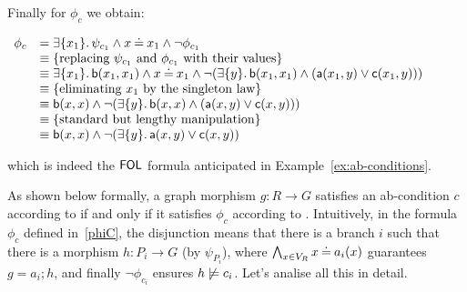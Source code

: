 \begin{example}
\medskip
Finally for $\phi_c$ we obtain:

$
\begin{array}{ll}
\phi_{c} & = \exists \{x_{1}\}.\, \psi_{c_{1}} \land x \mathbin{\doteq} x_{1} \land  \neg \phi_{c_{1}}\\
 & \equiv \{\text{replacing $\psi_{c_{1}}$ and $\phi_{c_{1}}$ with their values}\}\\
& \equiv \exists \{x_{1}\}.\,\mathsf{b}(x_{1},x_{1}) \land x \mathbin{\doteq} x_{1} \land  \neg (\exists \{y\} .\, \mathsf{b}(x_{1},x_{1})\land (\mathsf{a}(x_{1},y) \lor \mathsf{c}(x_{1},y)))\\
 & \equiv \{\text{eliminating $x_1$ by the singleton law}\}\\
& \equiv \mathsf{b}(x,x) \land \neg (\exists \{y\} .\, \mathsf{b}(x,x)\land (\mathsf{a}(x,y) \lor \mathsf{c}(x,y)))\\
 & \equiv \{\text{standard but lengthy manipulation}\}\\
& \equiv \mathsf{b}(x,x) \land \neg (\exists \{y\} .\, \mathsf{a}(x,y) \lor \mathsf{c}(x,y))\\
\end{array}
$


which is indeed the $\mathsf{FOL}$ formula anticipated in Example~\ref{ex:ab-conditions}.


\end{example}


As shown below formally, a graph morphism $g: R \to G$ satisfies an ab-condition $c$ according to  if and only if it satisfies $\phi_c$ according to . Intuitively, in the formula $\phi_c$ defined in~\eqref{phiC}, the disjunction means that there is a branch $i$ such that there is a morphism $h: P_i \to G$ (by $\psi_{P_i}$), where  $\bigwedge_{x \in V_{R}} x \mathbin{\doteq} a_i(x)$ guarantees $g=a_i;h$, and finally $\neg \phi_{c_i}$ ensures $h\not\models c_i$. Let's analise all this in detail.


